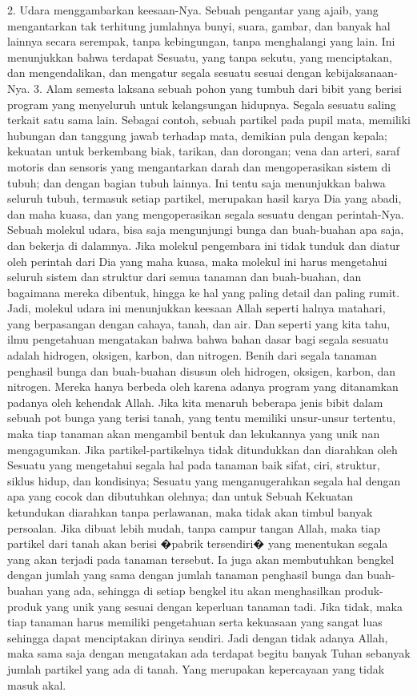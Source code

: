 \documentclass[]{article}
\begin{document}
2. Udara menggambarkan keesaan-Nya.  Sebuah pengantar yang ajaib, yang mengantarkan tak terhitung jumlahnya bunyi, suara,  gambar, dan banyak hal lainnya secara serempak, tanpa kebingungan, tanpa menghalangi yang lain. Ini menunjukkan bahwa terdapat Sesuatu, yang tanpa sekutu, yang menciptakan, dan mengendalikan, dan mengatur segala sesuatu sesuai dengan kebijaksanaan-Nya.
3. Alam semesta laksana sebuah pohon yang tumbuh dari bibit yang berisi program yang menyeluruh untuk kelangsungan hidupnya. Segala sesuatu saling terkait satu sama lain. Sebagai contoh, sebuah partikel pada pupil mata,  memiliki hubungan dan tanggung jawab terhadap mata, demikian pula dengan kepala; kekuatan untuk berkembang biak, tarikan, dan dorongan; vena dan arteri, saraf motoris dan sensoris yang mengantarkan darah dan mengoperasikan sistem di tubuh; dan dengan bagian tubuh lainnya. Ini tentu saja menunjukkan bahwa seluruh tubuh, termasuk setiap partikel,  merupakan hasil karya Dia yang abadi, dan maha kuasa, dan yang mengoperasikan segala sesuatu dengan perintah-Nya.
Sebuah molekul udara, bisa saja mengunjungi bunga dan buah-buahan apa saja, dan bekerja di dalamnya. Jika molekul pengembara ini tidak tunduk dan diatur oleh perintah dari Dia yang maha kuasa, maka molekul ini harus mengetahui seluruh sistem dan struktur dari semua tanaman dan buah-buahan, dan bagaimana mereka dibentuk, hingga ke hal yang paling detail dan paling rumit.  Jadi, molekul udara ini menunjukkan keesaan Allah seperti halnya matahari, yang berpasangan dengan cahaya, tanah, dan air. Dan seperti  yang kita tahu, ilmu pengetahuan mengatakan bahwa bahwa bahan dasar bagi segala sesuatu adalah hidrogen,  oksigen, karbon, dan nitrogen. 
Benih dari segala tanaman penghasil bunga dan buah-buahan disusun oleh hidrogen, oksigen, karbon, dan nitrogen. Mereka hanya berbeda oleh  karena adanya program yang ditanamkan padanya oleh kehendak Allah.  Jika kita menaruh  beberapa jenis bibit dalam sebuah pot bunga yang terisi tanah,  yang tentu memiliki unsur-unsur tertentu, maka tiap tanaman akan mengambil bentuk dan lekukannya  yang unik nan mengagumkan. Jika partikel-partikelnya tidak ditundukkan dan diarahkan oleh Sesuatu yang mengetahui segala hal pada tanaman baik sifat, ciri, struktur, siklus hidup, dan kondisinya;  Sesuatu yang menganugerahkan segala hal dengan apa yang cocok dan dibutuhkan olehnya; dan untuk Sebuah Kekuatan ketundukan diarahkan tanpa perlawanan, maka tidak akan timbul banyak persoalan. 
Jika dibuat lebih mudah, tanpa campur tangan Allah, maka tiap partikel dari tanah akan berisi �pabrik tersendiri� yang menentukan    segala yang akan terjadi pada tanaman tersebut. Ia juga akan membutuhkan bengkel dengan jumlah yang sama dengan jumlah tanaman penghasil bunga dan buah-buahan yang ada, sehingga di setiap bengkel itu akan menghasilkan produk-produk yang unik yang sesuai dengan keperluan tanaman tadi.   Jika tidak, maka tiap tanaman harus memiliki pengetahuan serta kekuasaan yang sangat luas sehingga dapat menciptakan dirinya sendiri. Jadi dengan  tidak adanya Allah, maka sama saja dengan mengatakan ada terdapat begitu banyak Tuhan sebanyak jumlah partikel yang ada di tanah. Yang merupakan kepercayaan yang tidak masuk akal.  
\end{document}
